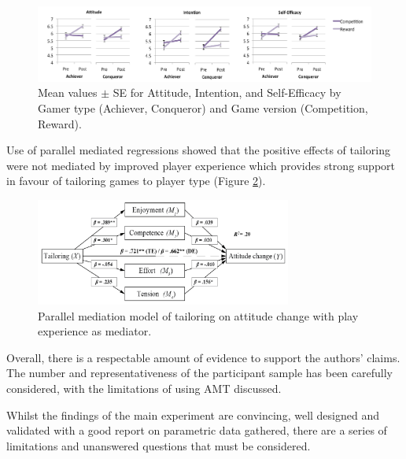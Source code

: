 \documentclass[11pt]{article}
\begin{document}
\begin{figure}[H]
\centering
\includegraphics[width=\textwidth]{img/orji2017-tailoring-results.png} 
\caption{Mean values $\pm$ SE for Attitude, Intention, and Self-Efficacy by Gamer type (Achiever, Conqueror) and Game version (Competition, Reward).}\label{fig:orji2017-tailoring-results}
\end{figure}

Use of parallel mediated regressions \citep{hayes2013} showed that the positive effects of tailoring were not mediated by improved player experience which provides strong support in favour of tailoring games to player type (Figure \ref{fig:orji2017-tailoring-mediation-results}). 

\begin{figure}[H]
\centering
\includegraphics[width=0.75\textwidth]{img/orji2017-tailoring-mediation-results.png} 
\caption{Parallel mediation model of tailoring on attitude change with play experience as mediator.}\label{fig:orji2017-tailoring-mediation-results}
\end{figure}

Overall, there is a respectable amount of evidence to support the authors' claims. The number and representativeness of the participant sample has been carefully considered, with the limitations of using AMT discussed.

Whilst the findings of the main experiment are convincing, well designed and validated with a good report on parametric data gathered, there are a series of limitations and unanswered questions that must be considered.
\end{document}
